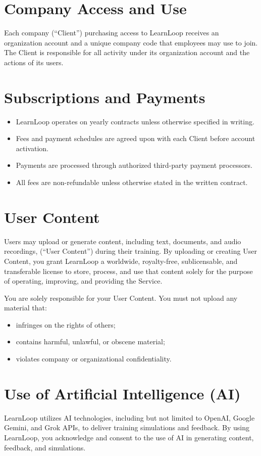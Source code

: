 \documentclass[12pt]{article}
\begin{document}
\section{Company Access and Use}
Each company (“Client”) purchasing access to LearnLoop receives an organization account and a unique company code that employees may use to join. The Client is responsible for all activity under its organization account and the actions of its users.

\section{Subscriptions and Payments}
\begin{itemize}[leftmargin=*]
    \item LearnLoop operates on yearly contracts unless otherwise specified in writing.
    \item Fees and payment schedules are agreed upon with each Client before account activation.
    \item Payments are processed through authorized third-party payment processors.
    \item All fees are non-refundable unless otherwise stated in the written contract.
\end{itemize}

\section{User Content}
Users may upload or generate content, including text, documents, and audio recordings, (“User Content”) during their training. By uploading or creating User Content, you grant LearnLoop a worldwide, royalty-free, sublicensable, and transferable license to store, process, and use that content solely for the purpose of operating, improving, and providing the Service.

You are solely responsible for your User Content. You must not upload any material that:
\begin{itemize}[leftmargin=*]
    \item infringes on the rights of others;
    \item contains harmful, unlawful, or obscene material;
    \item violates company or organizational confidentiality.
\end{itemize}

\section{Use of Artificial Intelligence (AI)}
LearnLoop utilizes AI technologies, including but not limited to OpenAI, Google Gemini, and Grok APIs, to deliver training simulations and feedback. By using LearnLoop, you acknowledge and consent to the use of AI in generating content, feedback, and simulations.
\end{document}
